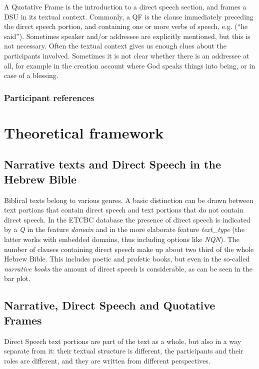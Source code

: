 \documentclass[twoside,a4paper,10pt]{article}
\newcommand{\hebr}[1]{\cjRL{#1}}
\newcommand{\mi}[1]{\emph{#1}}
\begin{document}
A Quotative Frame is the introduction to a direct speech section, and frames a DSU in its textual context. Commonly, a QF is the clause immediately preceding the direct speech portion, and containing one or more verbs of speech, e.g. \hebr{WJMR} (``he said''). Sometimes speaker and/or addressee are explicitly mentioned, but this is not necessary. Often the textual context gives us enough clues about the participants involved. Sometimes it is not clear whether there is an addressee at all, for example in the creation account where God speaks things into being, or in case of a blessing.

\subsubsection{Participant references}

\section{Theoretical framework}
\subsection{Narrative texts and Direct Speech in the Hebrew Bible}
Biblical texts belong to various genres. A basic distinction can be drawn between text portions that contain direct speech and text portions that do not contain direct speech. In the ETCBC database the presence of direct speech is indicated by a \mi{Q} in the feature \mi{domain} and in the more elaborate feature \mi{text\_type} (the latter works with embedded domains, thus including options like \mi{NQN}). The number of clauses containing direct speech make up about two third of the whole Hebrew Bible. This includes poetic and profetic books, but even in the so-called \emph{narrative books} the amount of direct speech is considerable, as can be seen in the bar plot.
\begin{minipage}{.9\textwidth}

\end{minipage}

\subsection{Narrative, Direct Speech and Quotative Frames}
Direct Speech text portions are part of the text as a whole, but also in a way separate from it: their textual structure is different, the participants and their roles are different, and they are written from different perspectives.
\end{document}
